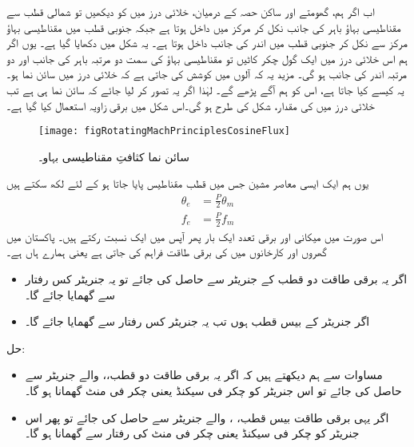 اب اگر ہم، گھومتے اور ساکن حصہ کے درمیان، خلائی درز میں  کو دیکھیں تو شمالی قطب سے مقناطیسی بہاؤ باہر کی جانب  نکل کر  مرکز میں داخل ہوتا ہے جبکہ جنوبی قطب میں مقناطیسی بہاؤ مرکز سے نکل کر جنوبی قطب میں اندر کی جانب داخل ہوتا ہے۔ یہ شکل   میں دکھایا گیا ہے۔ یوں اگر ہم اس خلائی درز میں ایک گول چکر کاٹیں تو مقناطیسی بہاؤ کی سمت  دو مرتبہ باہر کی جانب اور دو مرتبہ اندر کی جانب ہو گی۔ مزید یہ کہ   آلوں میں کوشش کی جاتی ہے کہ خلائی درز میں  سائن نما ہو۔ یہ کیسے کیا جاتا ہے، اس کو ہم آگے پڑھے گے۔  لہٰذا اگر یہ تصور کر لیا جائے کہ  سائن نما ہی ہے تب  خلائی درز میں  کی مقدار، شکل   کی طرح ہو گی۔اس شکل میں برقی زاویہ  استعمال کیا گیا ہے۔ 
\begin{figure}
\centering
\texttt{[image: figRotatingMachPrinciplesCosineFlux]}
\caption{سائن نما کثافتِ مقناطیسی بہاو۔}
\label{شکل_گھومتے_مشین_سائن_نما_بہاو}
\end{figure}

 یوں ہم ایک ایسی معاصر مشین جس میں  قطب مقناطیس پایا جاتا ہو کے لئے لکھ سکتے ہیں
\begin{align}
\theta_e&=\frac{P}{2} \theta_m\\
f_e&=\frac{P}{2} f_m
\end{align}
اس صورت میں میکانی اور برقی تعدد ایک بار پھر آپس میں ایک نسبت رکتے ہیں۔ 
%
پاکستان میں گھروں اور کارخانوں میں  کی برقی طاقت فراہم کی جاتی ہے یعنی ہمارے ہاں  ہے۔
\begin{itemize}
\item
اگر یہ برقی طاقت دو قطب کے جنریٹر سے حاصل کی جائے تو یہ جنریٹر  کس رفتار سے گھمایا جائے گا۔
\item
اگر جنریٹر کے بیس قطب ہوں تب یہ جنریٹر کس رفتار سے گھمایا جائے گا۔
\end{itemize}

حل:
\begin{itemize}
\item
مساوات  سے ہم دیکھتے ہیں کہ اگر یہ برقی طاقت دو قطب،،  والے جنریٹر سے حاصل کی جائے تو اس جنریٹر کو  چکر فی سیکنڈ یعنی  چکر فی منٹ گھمانا ہو گا۔
\item
 اگر یہی برقی طاقت بیس قطب، ،  والے جنریٹر سے حاصل کی جائے تو پھر اس جنریٹر کو  چکر فی سیکنڈ یعنی  چکر فی منٹ کی رفتار سے گھمانا ہو گا۔
\end{itemize}
%

